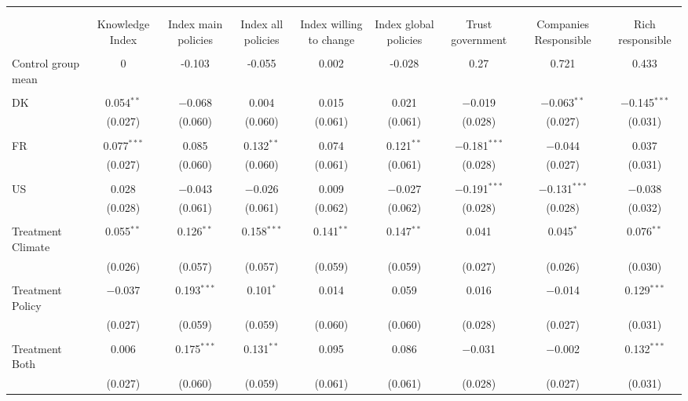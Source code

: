 
\begin{tabular}{@{\extracolsep{5pt}}lcccccccc} 
\\[-1.8ex]\hline 
\hline \\[-1.8ex] 
\\[-1.8ex] & Knowledge Index & Index main policies & Index all policies & Index willing to change & Index global policies & Trust government & Companies Responsible & Rich responsible \\ 
\hline \\[-1.8ex] 
 Control group mean & 0 & -0.103 & -0.055 & 0.002 & -0.028 & 0.27 & 0.721 & 0.433  \\ \hline \\[-1.8ex] DK & 0.054$^{**}$ & $-$0.068 & 0.004 & 0.015 & 0.021 & $-$0.019 & $-$0.063$^{**}$ & $-$0.145$^{***}$ \\ 
  & (0.027) & (0.060) & (0.060) & (0.061) & (0.061) & (0.028) & (0.027) & (0.031) \\ 
  & & & & & & & & \\ 
 FR & 0.077$^{***}$ & 0.085 & 0.132$^{**}$ & 0.074 & 0.121$^{**}$ & $-$0.181$^{***}$ & $-$0.044 & 0.037 \\ 
  & (0.027) & (0.060) & (0.060) & (0.061) & (0.061) & (0.028) & (0.027) & (0.031) \\ 
  & & & & & & & & \\ 
 US & 0.028 & $-$0.043 & $-$0.026 & 0.009 & $-$0.027 & $-$0.191$^{***}$ & $-$0.131$^{***}$ & $-$0.038 \\ 
  & (0.028) & (0.061) & (0.061) & (0.062) & (0.062) & (0.028) & (0.028) & (0.032) \\ 
  & & & & & & & & \\ 
 Treatment Climate & 0.055$^{**}$ & 0.126$^{**}$ & 0.158$^{***}$ & 0.141$^{**}$ & 0.147$^{**}$ & 0.041 & 0.045$^{*}$ & 0.076$^{**}$ \\ 
  & (0.026) & (0.057) & (0.057) & (0.059) & (0.059) & (0.027) & (0.026) & (0.030) \\ 
  & & & & & & & & \\ 
 Treatment Policy & $-$0.037 & 0.193$^{***}$ & 0.101$^{*}$ & 0.014 & 0.059 & 0.016 & $-$0.014 & 0.129$^{***}$ \\ 
  & (0.027) & (0.059) & (0.059) & (0.060) & (0.060) & (0.028) & (0.027) & (0.031) \\ 
  & & & & & & & & \\ 
 Treatment Both & 0.006 & 0.175$^{***}$ & 0.131$^{**}$ & 0.095 & 0.086 & $-$0.031 & $-$0.002 & 0.132$^{***}$ \\ 
  & (0.027) & (0.060) & (0.059) & (0.061) & (0.061) & (0.028) & (0.027) & (0.031) \\ 

\end{tabular}
